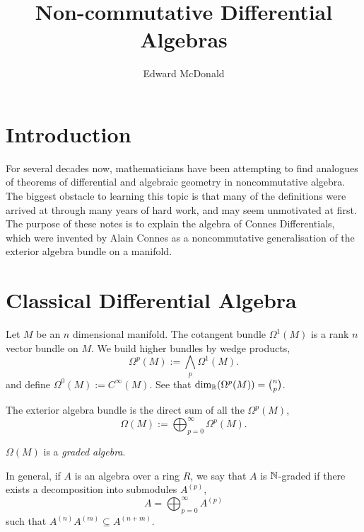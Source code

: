\documentclass{owmaths}
\begin{document}
\subject{Non-Commutative Geometry}
\author{Edward McDonald}
\title{Non-commutative Differential Algebras}

\newcommand{\Cliff}{\operatorname{Cliff}}
\newcommand{\im}{\operatorname{im}}
\newcommand{\com}{\mathrm{com}}
\newcommand{\Hom}{\operatorname{Hom}}
\newcommand{\A}{\mathcal{A}}
\newcommand{\Hilb}{\mathcal{H}}
\newcommand{\D}{\mathcal{D}}


\setlength\parindent{0pt}

\section{Introduction}
For several decades now, mathematicians have been attempting to find analogues
of theorems of differential and algebraic geometry in noncommutative 
algebra.
The biggest obstacle to learning this topic is that many of the definitions
were arrived at through many years of hard work, and may seem unmotivated at first.
The purpose of these notes is to explain the algebra of Connes Differentials,
which were invented by Alain Connes as a noncommutative generalisation
of the exterior algebra bundle on a manifold.

\section{Classical Differential Algebra}
Let $M$ be an $n$ dimensional manifold. The cotangent bundle $\Omega^1(M)$
is a rank $n$ vector bundle on $M$. We build higher bundles by wedge products,
\begin{equation*}
    \Omega^p(M) := \bigwedge_p \Omega^1(M).
\end{equation*}
and define $\Omega^0(M) := C^\infty(M)$. See that $\dim_{\mathbb{R}}(\Omega^p(M)) = \binom{n}{p}$.


The exterior algebra bundle is the direct sum of all the $\Omega^p(M)$,
\begin{equation*}
    \Omega(M) := \bigoplus_{p=0}^\infty \Omega^p(M).
\end{equation*}


$\Omega(M)$ is a \emph{graded algebra}.


In general, if $A$ is an algebra over a ring $R$, we say that $A$ is $\mathbb{N}$-graded
if there exists a decomposition into submodules $A^{(p)}$,
\begin{equation*}
    A = \bigoplus_{p=0}^\infty A^{(p)}
\end{equation*}
such that $A^{(n)}A^{(m)} \subseteq A^{(n+m)}$.
\end{document}
